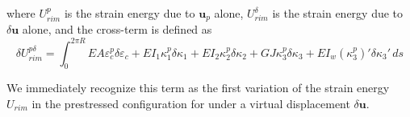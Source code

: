 \documentclass[\rootdir/thesis.tex]{subfiles}
\begin{document}
where $U_{rim}^p$ is the strain energy due to $\mathbf{u}_p$ alone, $U_{rim}^{\delta}$ is the strain energy due to $\delta\mathbf{u}$ alone, and the cross-term is defined as
\begin{equation}
\label{eq:U_rim_pd}
\delta U_{rim}^{p\delta} = \int_0^{2\pi R}
	EA\varepsilon_c^p \delta\varepsilon_c +
	EI_1\kappa_1^p\delta\kappa_1 +
	EI_2\kappa_2^p\delta\kappa_2 +
	GJ\kappa_3^p\delta\kappa_3 +
	EI_w(\kappa_3^p)'\delta\kappa_3'\, ds
\end{equation}

We immediately recognize this term as the first variation of the strain energy $U_{rim}$ in the prestressed configuration for under a virtual displacement $\delta\mathbf{u}$.




\end{document}
